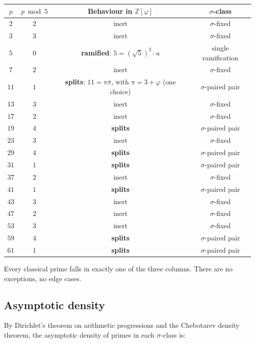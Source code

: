 \documentclass[11pt,a4paper]{article}
\theoremstyle{definition}
\theoremstyle{remark}
\begin{document}
\begin{center}\small
\begin{tabular}{cccc}\toprule
$p$ & $p \bmod 5$ & Behaviour in $\mathbb{Z}[\varphi]$ & $\sigma$-class \\\midrule
$2$ & $2$ & inert & $\sigma$-fixed \\
$3$ & $3$ & inert & $\sigma$-fixed \\
$5$ & $0$ & \textbf{ramified}: $5 = (\sqrt{5})^2 \cdot u$ & single ramification \\
$7$ & $2$ & inert & $\sigma$-fixed \\
$11$ & $1$ & \textbf{splits}: $11 = \pi \bar{\pi}$, with $\pi = 3 + \varphi$ (one choice) & $\sigma$-paired pair \\
$13$ & $3$ & inert & $\sigma$-fixed \\
$17$ & $2$ & inert & $\sigma$-fixed \\
$19$ & $4$ & \textbf{splits} & $\sigma$-paired pair \\
$23$ & $3$ & inert & $\sigma$-fixed \\
$29$ & $4$ & \textbf{splits} & $\sigma$-paired pair \\
$31$ & $1$ & \textbf{splits} & $\sigma$-paired pair \\
$37$ & $2$ & inert & $\sigma$-fixed \\
$41$ & $1$ & \textbf{splits} & $\sigma$-paired pair \\
$43$ & $3$ & inert & $\sigma$-fixed \\
$47$ & $2$ & inert & $\sigma$-fixed \\
$53$ & $3$ & inert & $\sigma$-fixed \\
$59$ & $4$ & \textbf{splits} & $\sigma$-paired pair \\
$61$ & $1$ & \textbf{splits} & $\sigma$-paired pair \\
\bottomrule\end{tabular}
\end{center}

Every classical prime falls in exactly one of the three columns. There
are no exceptions, no edge cases.

\subsection{Asymptotic density}\label{ssec:density}

By Dirichlet's theorem on arithmetic progressions and the Chebotarev
density theorem, the asymptotic density of primes in each $\sigma$-class
is:
\end{document}
